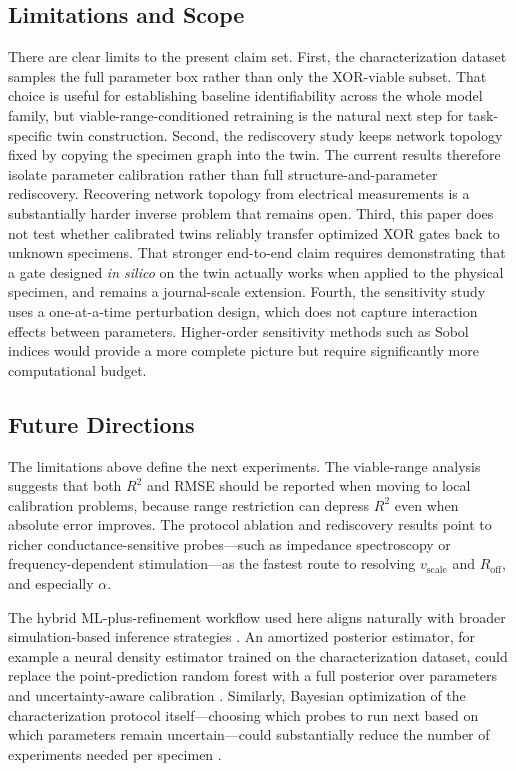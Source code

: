 \documentclass[letterpaper]{article}
\begin{document}
\subsection{Limitations and Scope}
There are clear limits to the present claim set. First, the characterization dataset samples the full parameter box rather than only the XOR-viable subset. That choice is useful for establishing baseline identifiability across the whole model family, but viable-range-conditioned retraining is the natural next step for task-specific twin construction. Second, the rediscovery study keeps network topology fixed by copying the specimen graph into the twin. The current results therefore isolate parameter calibration rather than full structure-and-parameter rediscovery. Recovering network topology from electrical measurements is a substantially harder inverse problem that remains open. Third, this paper does not test whether calibrated twins reliably transfer optimized XOR gates back to unknown specimens. That stronger end-to-end claim requires demonstrating that a gate designed \textit{in silico} on the twin actually works when applied to the physical specimen, and remains a journal-scale extension. Fourth, the sensitivity study uses a one-at-a-time perturbation design, which does not capture interaction effects between parameters. Higher-order sensitivity methods such as Sobol indices \citep{sobol2001global} would provide a more complete picture but require significantly more computational budget.

\subsection{Future Directions}
The limitations above define the next experiments. The viable-range analysis suggests that both $R^2$ and RMSE should be reported when moving to local calibration problems, because range restriction can depress $R^2$ even when absolute error improves. The protocol ablation and rediscovery results point to richer conductance-sensitive probes---such as impedance spectroscopy or frequency-dependent stimulation---as the fastest route to resolving $v_{\text{scale}}$ and $R_{\mathrm{off}}$, and especially $\alpha$.

The hybrid ML-plus-refinement workflow used here aligns naturally with broader simulation-based inference strategies \citep{cranmer2020frontier}. An amortized posterior estimator, for example a neural density estimator trained on the characterization dataset, could replace the point-prediction random forest with a full posterior over parameters and uncertainty-aware calibration \citep{papamakarios2021normalizing}. Similarly, Bayesian optimization of the characterization protocol itself---choosing which probes to run next based on which parameters remain uncertain---could substantially reduce the number of experiments needed per specimen \citep{snoek2012practical, shahriari2016taking}.
\end{document}
